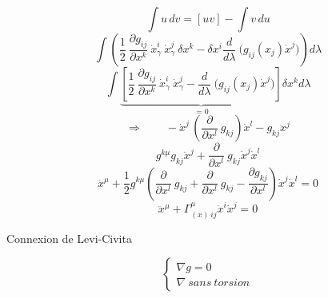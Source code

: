 \[
\int u\,dv = [uv]-\int v\,du
\]
\[
\int\left(\frac{1}{2}\ \frac{\partial g_{ij}}{\partial x^k}
\ \dot{x}_\gamma^i\ \dot{x}_\gamma^j\ \delta x^k
-\delta x^i
\frac{d}{d\lambda}\ \big(g_{ij}(x_j) \dot{x}^j\big) \right)d\lambda
\]
\[
\int\underbrace{\left[\frac{1}{2}\ \frac{\partial g_{ij}}{\partial x^k}
\ \dot{x}_\gamma^i\ \dot{x}_\gamma^j-\frac{d}{d\lambda}
\ \big(g_{ij}(x_j) \dot{x}^j\big) \right]}_{=0}\delta x^kd\lambda
\]
\[
\Rightarrow \qquad -\dot{x}^j\,\left(\frac{\partial }{\partial x^l}\ g_{kj}\right)
\dot{x}^l - g_{kj}\ddot{x}^j
\]
\[
g^{k\mu}g_{kj}\ddot{x}^j + \frac{\partial }{\partial x^l}\ g_{kj}\dot{x}^j\dot{x}^l
\]
\[
\ddot{x}^\mu + \frac{1}{2}g^{k\mu} \left( \frac{\partial}{\partial x^l}\ g_{kj}
+\frac{\partial}{\partial x^l}\ g_{kj} - \frac{\partial g_{kj}}{\partial x^l}
\right)\dot{x}^j\dot{x}^l = 0
\]
\[
\ddot{x}^\mu + \Gamma^\mu_{(x)\ ij} \dot{x}^i\dot{x}^j = 0
\]

Connexion de Levi-Civita

\[
\left\{
\begin{array}{ l }
 \nabla g = 0 \\
 \nabla\ sans\ torsion
\end{array}\right.
\]

